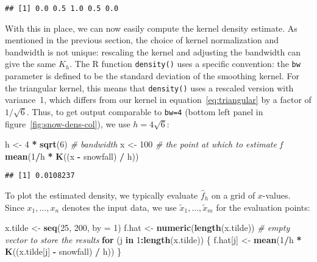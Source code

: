 \documentclass[
  a4paper,
]{article}
\newenvironment{Shaded}{\begin{snugshade}}{\end{snugshade}}
\newcommand{\AttributeTok}[1]{\textcolor[rgb]{0.13,0.29,0.53}{#1}}
\newcommand{\CommentTok}[1]{\textcolor[rgb]{0.56,0.35,0.01}{\textit{#1}}}
\newcommand{\ControlFlowTok}[1]{\textcolor[rgb]{0.13,0.29,0.53}{\textbf{#1}}}
\newcommand{\DecValTok}[1]{\textcolor[rgb]{0.00,0.00,0.81}{#1}}
\newcommand{\FunctionTok}[1]{\textcolor[rgb]{0.13,0.29,0.53}{\textbf{#1}}}
\newcommand{\NormalTok}[1]{#1}
\newcommand{\OtherTok}[1]{\textcolor[rgb]{0.56,0.35,0.01}{#1}}
\newcommand{\SpecialCharTok}[1]{\textcolor[rgb]{0.81,0.36,0.00}{\textbf{#1}}}
\theoremstyle{definition}
\theoremstyle{definition}
\theoremstyle{definition}
\theoremstyle{definition}
\theoremstyle{remark}
\begin{document}
\begin{verbatim}
## [1] 0.0 0.5 1.0 0.5 0.0
\end{verbatim}

With this in place, we can now easily compute the kernel density estimate.
As mentioned in the previous section, the choice of kernel normalization and
bandwidth is not unique: rescaling the kernel and adjusting the bandwidth can
give the same \(K_h\). The R function \texttt{density()} uses a specific convention:
the \texttt{bw} parameter is defined to be the standard deviation of the smoothing kernel.
For the triangular kernel, this means that \texttt{density()} uses a rescaled version
with variance~1, which differs from our kernel in equation~\eqref{eq:triangular}
by a factor of \(1/\sqrt{6}\). Thus, to get output comparable to \texttt{bw=4}
(bottom left panel in figure~\ref{fig:snow-dens-col}), we use \(h = 4\sqrt{6}\):

\begin{Shaded}
\begin{Highlighting}[]
\NormalTok{h }\OtherTok{\textless{}{-}} \DecValTok{4} \SpecialCharTok{*} \FunctionTok{sqrt}\NormalTok{(}\DecValTok{6}\NormalTok{) }\CommentTok{\# bandwidth}
\NormalTok{x }\OtherTok{\textless{}{-}} \DecValTok{100} \CommentTok{\# the point at which to estimate f}
\FunctionTok{mean}\NormalTok{(}\DecValTok{1}\SpecialCharTok{/}\NormalTok{h }\SpecialCharTok{*} \FunctionTok{K}\NormalTok{((x }\SpecialCharTok{{-}}\NormalTok{ snowfall) }\SpecialCharTok{/}\NormalTok{ h))}
\end{Highlighting}
\end{Shaded}

\begin{verbatim}
## [1] 0.0108237
\end{verbatim}

To plot the estimated density, we typically evaluate \(\hat f_h\) on a grid of \(x\)-values.
Since \(x_1, \ldots, x_n\) denotes the input data, we use \(\tilde x_1, \ldots, \tilde x_m\)
for the evaluation points:

\begin{Shaded}
\begin{Highlighting}[]
\NormalTok{x.tilde }\OtherTok{\textless{}{-}} \FunctionTok{seq}\NormalTok{(}\DecValTok{25}\NormalTok{, }\DecValTok{200}\NormalTok{, }\AttributeTok{by =} \DecValTok{1}\NormalTok{)}
\NormalTok{f.hat }\OtherTok{\textless{}{-}} \FunctionTok{numeric}\NormalTok{(}\FunctionTok{length}\NormalTok{(x.tilde)) }\CommentTok{\# empty vector to store the results}
\ControlFlowTok{for}\NormalTok{ (j }\ControlFlowTok{in} \DecValTok{1}\SpecialCharTok{:}\FunctionTok{length}\NormalTok{(x.tilde)) \{}
\NormalTok{  f.hat[j] }\OtherTok{\textless{}{-}} \FunctionTok{mean}\NormalTok{(}\DecValTok{1}\SpecialCharTok{/}\NormalTok{h }\SpecialCharTok{*} \FunctionTok{K}\NormalTok{((x.tilde[j] }\SpecialCharTok{{-}}\NormalTok{ snowfall) }\SpecialCharTok{/}\NormalTok{ h))}
\NormalTok{\}}
\end{Highlighting}
\end{Shaded}
\end{document}

